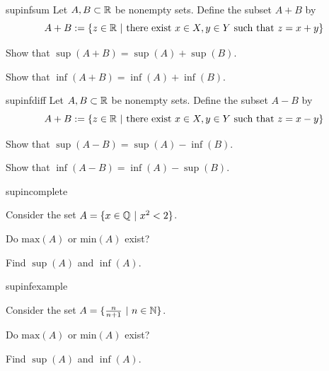\begin{problem}{supinfsum}
    Let $A, B \subset \mathbb{R}$ be nonempty sets.  Define the subset $A+ B$ by 
    $$A + B := \{ z \in \mathbb{R} \ | \ \text{there exist } x\in X, y \in Y \text{ such that } z = x+y\}$$

    \begin{subproblems}
        \item Show that $\sup(A+B) = \sup(A) + \sup(B)$.
        \item Show that $\inf(A+B) = \inf(A) + \inf(B)$.
    \end{subproblems}

\end{problem}

\begin{problem}{supinfdiff}
    Let $A, B \subset \mathbb{R}$ be nonempty sets.  Define the subset $A- B$ by 
    $$A + B := \{ z \in \mathbb{R} \ | \ \text{there exist } x\in X, y \in Y \text{ such that } z = x-y\}$$


    \begin{subproblems}
        \item Show that $\sup(A-B) = \sup(A) - \inf(B)$.
        \item Show that $\inf(A-B) = \inf(A) - \sup(B)$.
    \end{subproblems}

    
\end{problem}


\begin{problem}{supincomplete}

    Consider the set $A = \{x \in \mathbb{Q} \ | \ x^2 < 2 \}$.  
    
    \begin{subproblems}
        \item Do $\text{max}(A)$ or $\text{min}(A)$ exist?
        \item Find $\sup(A)$ and $\inf(A)$.  
    \end{subproblems}
    
    
    
\end{problem}

\begin{problem}{supinfexample}

    Consider the set $A = \{ \frac{n}{n+1} \ | \ n \in \mathbb{N} \}$.  

    
    \begin{subproblems}
        \item Do $\text{max}(A)$ or $\text{min}(A)$ exist?
        \item Find $\sup(A)$ and $\inf(A)$.  
    \end{subproblems}
\end{problem}


